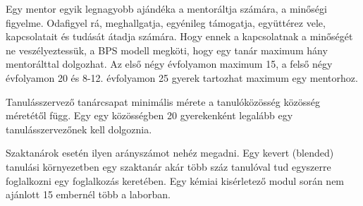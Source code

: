 Egy mentor egyik legnagyobb ajándéka a mentoráltja számára, a minőségi
figyelme. Odafigyel rá, meghallgatja, egyénileg támogatja, együttérez
vele, kapcsolatait és tudását átadja számára. Hogy ennek a kapcsolatnak
a minőségét ne veszélyeztessük, a BPS modell megköti, hogy egy tanár
maximum hány mentorálttal dolgozhat. Az első négy évfolyamon maximum 15,
a felső négy évfolyamon 20 és 8-12. évfolyamon 25 gyerek tartozhat
maximum egy mentorhoz.

Tanulásszervező tanárcsapat minimális mérete a tanulóközösség közösség
méretétől függ. Egy egy közösségben 20 gyerekenként legalább egy
tanulásszervezőnek kell dolgoznia.

Szaktanárok esetén ilyen arányszámot nehéz megadni. Egy kevert (blended)
tanulási környezetben egy szaktanár akár több száz tanulóval tud
egyszerre foglalkozni egy foglalkozás keretében. Egy kémiai kisérletező
modul során nem ajánlott 15 embernél több a laborban.

